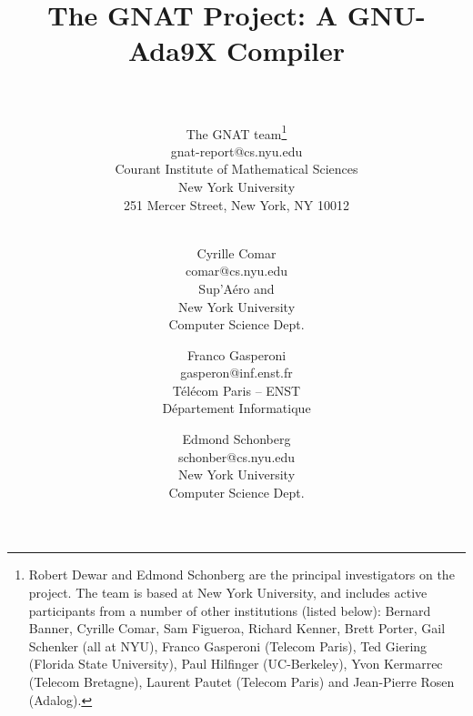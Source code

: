 %
\setlength{\oddsidemargin}{0.1in}
\setlength{\evensidemargin}{0.1in}
\setlength{\textwidth}{6in}
\setlength{\topmargin}{-0.5in}
\setlength{\textheight}{8.5in}
%
\def\xline{\mbox{}\hrulefill\mbox{}}
%

\pagestyle{plain}

\title{The GNAT Project: A GNU-Ada9X Compiler\\
\ \\}

\date{}

\author{The GNAT team\thanks{Robert Dewar and Edmond Schonberg are the
principal investigators on the project. The team is based at New York
University, and includes active participants from a number of other
institutions (listed below): Bernard Banner, Cyrille Comar, Sam
Figueroa, Richard Kenner, Brett Porter, Gail Schenker (all at NYU),
Franco Gasperoni (Telecom Paris), Ted Giering (Florida State
University), Paul Hilfinger (UC-Berkeley), Yvon Kermarrec (Telecom
Bretagne), Laurent Pautet (Telecom Paris) and Jean-Pierre Rosen
(Adalog).}
\\
{\small \mbox{\ \hskip 4cm} gnat-report@cs.nyu.edu \mbox{\ \hskip 4cm}}\\
{\small Courant Institute of Mathematical Sciences}\\
{\small New York University}\\
{\small 251 Mercer Street, New York, NY 10012}\\
{\small \mbox{\ }}
\and
Cyrille Comar \\
{\small comar@cs.nyu.edu}\\
{\small Sup'A\'ero and}\\
{\small New York University}\\
{\small Computer Science Dept.}
\and 
Franco Gasperoni\\
{\small gasperon@inf.enst.fr}\\
{\small T\'el\'ecom Paris -- ENST}\\
{\small D\'epartement Informatique}
\and
Edmond Schonberg\\
{\small schonber@cs.nyu.edu}\\
{\small New York University}\\
{\small Computer Science Dept.}
%
}

